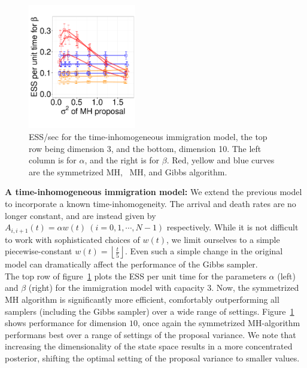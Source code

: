{\begin{figure}
\begin{minipage}[!hp]{0.99\linewidth}
    \includegraphics [width=0.42\textwidth, angle=0]{figs/pc_10_beta.pdf}
    \vspace{-.3 in}
  \end{minipage}
  \begin{minipage}[!hp]{0.04\linewidth}
  \end{minipage}
    \caption{ESS/sec for the time-inhomogeneous immigration model, the top row 
      being dimension 3, and the bottom,
      dimension 10. The left column is for $\alpha$, and the 
    right is for $\beta$. Red, yellow and blue curves are the symmetrized MH,
  \naive\ MH, and Gibbs algorithm.}
     \label{fig:ESS_pc_10}
  \end{figure}
\textbf{A time-inhomogeneous immigration model:}
We extend the previous model to incorporate a known time-inhomogeneity. 
The arrival and death rates are no longer constant, and are instead given by
$A_{i, i+1}(t) = \alpha w(t) \ (i =0,1,\cdots,N-1)$ respectively.
While it is not difficult to work with sophisticated choices of $w(t)$,
we limit ourselves to a simple piecewise-constant 
$w(t) = \left\lfloor \frac{t}{5} \right\rfloor$. Even such a simple
change in the original model can dramatically affect the performance
of the Gibbs sampler. \\
 The top row of figure~\ref{fig:ESS_pc_10} plots the ESS per unit time for the 
 parameters $\alpha$ (left) and $\beta$ (right) for the immigration model with 
 capacity $3$.  Now, the symmetrized MH algorithm is significantly 
 more efficient, comfortably outperforming all samplers (including the Gibbs 
 sampler) over a wide range of settings. %
 Figure~\ref{fig:ESS_pc_10} shows performance for dimension
 $10$, once again the symmetrized MH-algorithm performans best over a 
 range of settings of the proposal variance. We note that increasing the
 dimensionality of the state space results in a more concentrated posterior,
 shifting the optimal setting of the proposal variance to smaller values.

}
